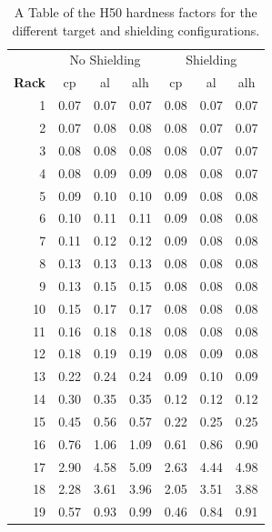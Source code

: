 \documentclass[main.tex]{subfiles}
\begin{document}
\begin{table}[htbp]
  \centering
    \begin{tabular}{r|c|c|c|c|c|c}
     & \multicolumn{3}{c|}{No Shielding} & \multicolumn{3}{c}{Shielding} \\ \cline{2-7}
    \textbf{Rack}  & cp    & al    & alh   & cp    & al    & alh \\ 
    \hline \hline
    1     & 0.07  & 0.07  & 0.07  & 0.08  & 0.07  & 0.07 \\
    2     & 0.07  & 0.08  & 0.08  & 0.08  & 0.07  & 0.07 \\
    3     & 0.08  & 0.08  & 0.08  & 0.08  & 0.07  & 0.07 \\
    4     & 0.08  & 0.09  & 0.09  & 0.08  & 0.08  & 0.07 \\
    5     & 0.09  & 0.10  & 0.10  & 0.09  & 0.08  & 0.08 \\
    6     & 0.10  & 0.11  & 0.11  & 0.09  & 0.08  & 0.08 \\
    7     & 0.11  & 0.12  & 0.12  & 0.09  & 0.08  & 0.08 \\
    8     & 0.13  & 0.13  & 0.13  & 0.08  & 0.08  & 0.08 \\
    9     & 0.13  & 0.15  & 0.15  & 0.08  & 0.08  & 0.08 \\
    10    & 0.15  & 0.17  & 0.17  & 0.08  & 0.08  & 0.08 \\
    11    & 0.16  & 0.18  & 0.18  & 0.08  & 0.08  & 0.08 \\
    12    & 0.18  & 0.19  & 0.19  & 0.08  & 0.09  & 0.08 \\
    13    & 0.22  & 0.24  & 0.24  & 0.09  & 0.10  & 0.09 \\
    14    & 0.30  & 0.35  & 0.35  & 0.12  & 0.12  & 0.12 \\
    15    & 0.45  & 0.56  & 0.57  & 0.22  & 0.25  & 0.25 \\
    16    & 0.76  & 1.06  & 1.09  & 0.61  & 0.86  & 0.90 \\
    17    & 2.90  & 4.58  & 5.09  & 2.63  & 4.44  & 4.98 \\
    18    & 2.28  & 3.61  & 3.96  & 2.05  & 3.51  & 3.88 \\
    19    & 0.57  & 0.93  & 0.99  & 0.46  & 0.84  & 0.91 \\
    \end{tabular}%
    \caption{A Table of the H50 hardness factors for the different target and shielding configurations.}
  \label{tab:addlabel}%
\end{table}%
\end{document}
